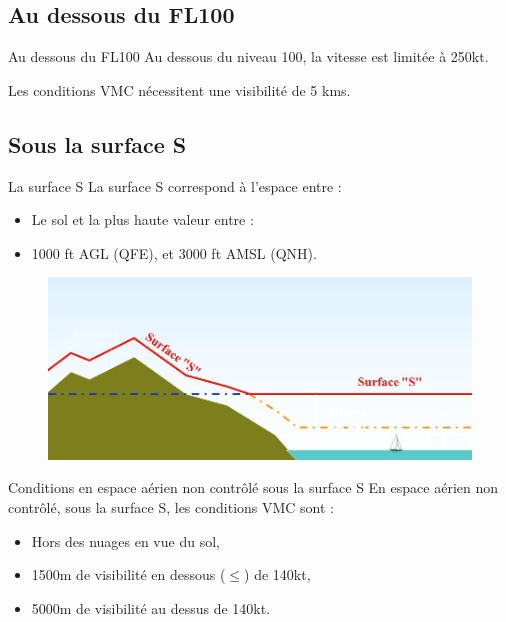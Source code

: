 \documentclass{beamer}
\begin{document}
\subsection{Au dessous du FL100}

\begin{frame}{Au dessous du FL100}
  Au dessous du niveau 100, la vitesse est limitée à 250kt.

  Les conditions VMC nécessitent une visibilité de 5 kms.
\end{frame}


\subsection{Sous la surface S}

\begin{frame}{La surface S}
  La surface S correspond à l'espace entre :

  \begin{itemize}
    \item Le sol et la plus haute valeur entre : \pause
    \item 1000 ft AGL (QFE), et 3000 ft AMSL (QNH). \pause
  \end{itemize}

  \pause
  \begin{figure}
    \centering
    \includegraphics[scale=1.2]{images/surface-s.png}
  \end{figure}
  
\end{frame}

\begin{frame}{Conditions en espace aérien non contrôlé sous la surface S}
  En espace aérien non contrôlé, sous la surface S, les conditions VMC sont :

  \pause
  
  \begin{itemize}
    \item Hors des nuages en vue du sol, \pause
    \item 1500m de visibilité en dessous ($\leq$) de 140kt, \pause
    \item 5000m de visibilité au dessus de 140kt.
  \end{itemize}

\end{frame}
\end{document}
